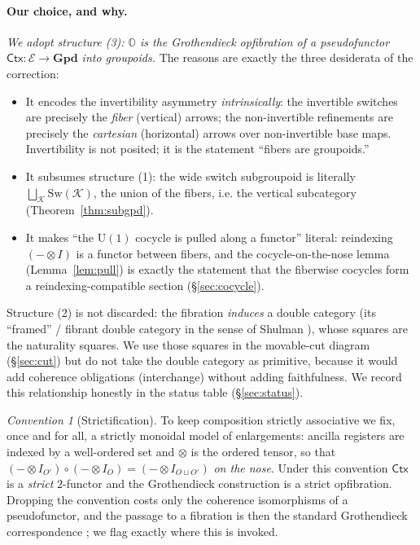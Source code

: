 \documentclass[11pt]{article}
\theoremstyle{definition}
\theoremstyle{remark}
\newtheorem*{convention}{Convention}
\newcommand{\K}{\mathcal K}
\newcommand{\Ecat}{\mathcal E}
\newcommand{\Oc}{\mathbb O}
\newcommand{\Sw}{\mathrm{Sw}}
\newcommand{\Ctx}{\mathsf{Ctx}}
\newcommand{\Gpd}{\mathbf{Gpd}}
\newcommand{\U}{\mathrm{U}}
\begin{document}
\paragraph{Our choice, and why.}
\emph{We adopt structure (3): $\Oc$ is the Grothendieck opfibration of a pseudofunctor
$\Ctx:\Ecat\to\Gpd$ into groupoids.} The reasons are exactly the three desiderata of
the correction:
\begin{itemize}[leftmargin=1.4em]
\item It encodes the invertibility asymmetry \emph{intrinsically}: the invertible
switches are precisely the \emph{fiber} (vertical) arrows; the non-invertible
refinements are precisely the \emph{cartesian} (horizontal) arrows over non-invertible
base maps. Invertibility is not posited; it is the statement ``fibers are groupoids.''
\item It subsumes structure (1): the wide switch subgroupoid is literally
$\bigsqcup_{\K}\Sw(\K)$, the union of the fibers, i.e. the vertical subcategory
(Theorem~\ref{thm:subgpd}).
\item It makes ``the $\U(1)$ cocycle is pulled along a functor'' literal: reindexing
$(-\otimes I)$ is a functor between fibers, and the cocycle-on-the-nose lemma
(Lemma~\ref{lem:pull}) is exactly the statement that the fiberwise cocycles form a
reindexing-compatible section (\S\ref{sec:cocycle}).
\end{itemize}
Structure (2) is not discarded: the fibration \emph{induces} a double category
(its ``framed'' / fibrant double category in the sense of Shulman
\cite{Shulman}), whose squares are the naturality squares. We use those squares in the
movable-cut diagram (\S\ref{sec:cut}) but do not take the double category as
primitive, because it would add coherence obligations (interchange) without adding
faithfulness. We record this relationship honestly in the status table
(\S\ref{sec:status}).

\begin{convention}[Strictification]\label{conv:strict}
To keep composition strictly associative we fix, once and for all, a strictly monoidal
model of enlargements: ancilla registers are indexed by a well-ordered set and
$\otimes$ is the ordered tensor, so that $(-\otimes I_{O'})\circ(-\otimes
I_{O})=(-\otimes I_{O\sqcup O'})$ \emph{on the nose}. Under this convention $\Ctx$ is a
\emph{strict} $2$-functor and the Grothendieck construction is a strict opfibration.
Dropping the convention costs only the coherence isomorphisms of a pseudofunctor, and
the passage to a fibration is then the standard Grothendieck correspondence
\cite{SGA1,JacobsBook,Johnstone}; we flag exactly where this is invoked.
\end{convention}
\end{document}
